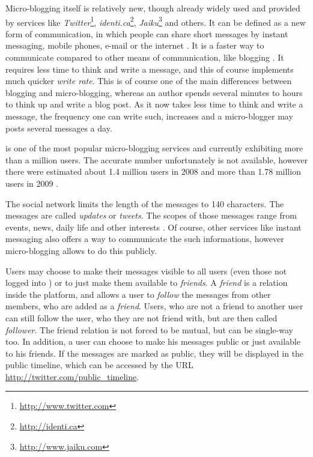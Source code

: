 Micro-blogging itself is relatively new, though already widely used and
provided by services like
\textit{Twitter}\footnote{\url{http://www.twitter.com}},
\textit{identi.ca}\footnote{\url{http://identi.ca}},
\textit{Jaiku}\footnote{\url{http://www.jaiku.com}} and others. It can be
defined as a new form of communication, in which people can share short
messages by instant messaging, mobile phones, e-mail or the internet
\cite{java2007}. It is a faster way to communicate compared to other means of
communication, like blogging \cite{java2007}. It requires less time to think
and write a message, and this of course implements much quicker \textit{write
rate}. This is of course one of the main differences between blogging and
micro-blogging, whereas an author spends several minutes to hours to think up
and write a blog post. As it now takes less time to think and write a message,
the frequency one can write such, increases and a micro-blogger may posts
several messages a day.

\Twitter{} is one of the most popular micro-blogging services \cite{java2007}
and currently exhibiting more than a million users. The accurate number
unfortunately is not available, however there were estimated about 1.4 million
users in 2008 \cite{krishnamurthy2008} and more than 1.78 million users in
2009 \cite{whitworth2009}.

The social network limits the length of the messages to 140 characters. The messages
are called \textit{updates} or \textit{tweets}. The scopes of those messages
range from events, news, daily life and other interests \cite{java2007}. Of
course, other services like instant messaging also offers a way to communicate
the such informations, however micro-blogging allows to do this publicly.

Users may choose to make their messages visible to all users (even those not
logged into \Twitter{}) or to just make them available to \textit{friends}. A
\textit{friend} is a relation inside the \Twitter{} platform, and allows a user
to \textit{follow} the messages from other members, who are added as a
\textit{friend}. Users, who are not a friend to another user can still follow
the user, who they are not friend with, but are then called \textit{follower}.
The friend relation is not forced to be mutual, but can be single-way too. In
addition, a user can choose to make his messages public or just available to
his friends. If the messages are marked as public, they will be displayed in
the public timeline, which can be accessed by the URL
\url{http://twitter.com/public_timeline}.

